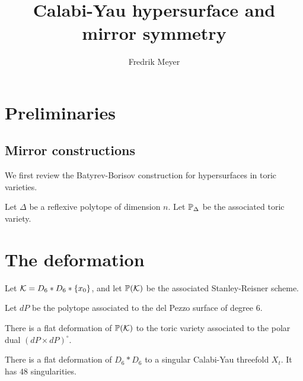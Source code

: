 \documentclass[11pt, english]{article}
\begin{document}
\title{Calabi-Yau hypersurface and mirror symmetry}
\author{Fredrik Meyer}
\maketitle 

\section{Preliminaries}

\subsection{Mirror constructions}

We first review the Batyrev-Borisov construction for hypersurfaces in toric varieties.

Let $\Delta$ be a reflexive polytope of dimension $n$. Let $\mathbb{P}_\Delta$ be the associated toric variety.

\section{The deformation}

Let $\mathcal K = D_6 \ast D_6 \ast \{ x_0 \}$, and let $\mathbb{P}(\mathcal K)$ be the associated Stanley-Reisner scheme.

Let $dP$ be the polytope associated to the del Pezzo surface of degree $6$.

\begin{prop}
There is a flat deformation of $\mathbb{P}(\mathcal K)$ to the toric variety associated to the polar dual $(dP \times dP)^\circ$.
\end{prop}

\begin{corr}
There is a flat deformation of $D_6 \ast D_6$ to a singular Calabi-Yau threefold $X_t$. It has $48$ singularities.
\end{corr}
\end{document}
